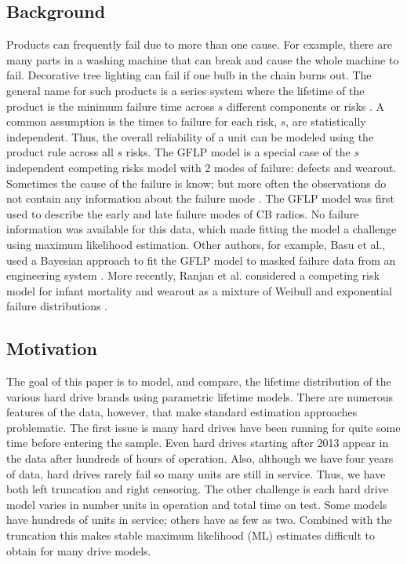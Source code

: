 \documentclass[12pt]{article}
\begin{document}
\subsection{Background}
Products can frequently fail due to more than one cause.  For example, there are many parts in a washing machine that can break and cause the whole machine to fail.  Decorative tree lighting can fail if one bulb in the chain burns out.  The general name for such products is a series system where the lifetime of the product is the minimum failure time across $s$ different components or risks \cite{nelson}.  A common assumption is the times to failure for each risk, $s$, are statistically independent.  Thus, the overall reliability of a unit can be modeled using the product rule across all $s$ risks.  The GFLP model is a special case of the $s$ independent competing risks model with 2 modes of failure: defects and wearout.  Sometimes the cause of the failure is know; but more often the observations do not contain any information about the failure mode \cite{chan}.  The GFLP model was first used to describe the early and late failure modes of CB radios.  No failure information was available for this data, which made fitting the model a challenge using maximum likelihood estimation.  Other authors, for example, Basu et al., used a Bayesian approach to fit the GFLP model to masked failure data from an engineering system \cite{basu}.  More recently, Ranjan et al. considered a competing risk model for infant mortality and wearout as a mixture of Weibull and exponential failure distributions \cite{ranjan}.  
 
\subsection{Motivation}
The goal of this paper is to model, and compare, the lifetime distribution of the various hard drive brands using parametric lifetime models.  There are numerous features of the data, however, that make standard estimation approaches problematic.  The first issue is many hard drives have been running for quite some time before entering the sample.  Even hard drives starting after 2013 appear in the data after hundreds of hours of operation.  Also, although we have four years of data, hard drives rarely fail so many units are still in service.  Thus, we have both left truncation and right censoring.  The other challenge is each hard drive model varies in number units in operation and total time on test.  Some models have hundreds of units in service; others have as few as two.  Combined with the truncation this makes stable maximum likelihood (ML) estimates difficult to obtain for many drive models. \\
\end{document}

